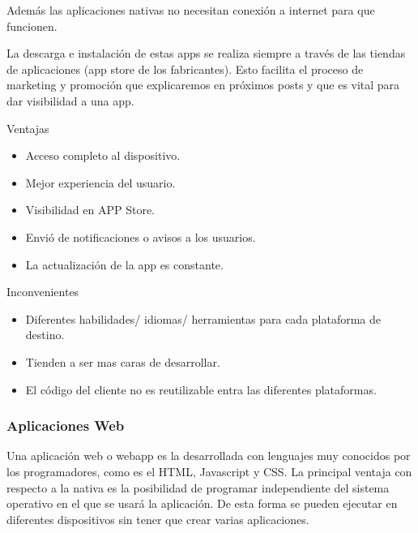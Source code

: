 Además las aplicaciones nativas no necesitan conexión a internet para que funcionen.

La descarga e instalación de estas apps se realiza siempre a través de las tiendas de aplicaciones (app store de los fabricantes). Esto facilita el proceso de marketing y promoción que explicaremos en próximos posts y que es vital para dar visibilidad a una app.

Ventajas
\setlength{\parskip}{0mm}
\begin{itemize}

	\item Acceso completo al dispositivo. 
	
	\item Mejor experiencia del usuario. 
	
	\item Visibilidad en APP Store.
	
	\item Envió de notificaciones o avisos a los usuarios.
	
	\item La actualización de la app es constante.
	
\end{itemize}

Inconvenientes

\begin{itemize}

	\item Diferentes habilidades/ idiomas/ herramientas para cada plataforma de destino.

	\item Tienden a ser mas caras de desarrollar. 

	\item El código del cliente no es reutilizable entra las diferentes plataformas.
	
\end{itemize}

\subsubsection{Aplicaciones Web}
\setlength{\parskip}{5mm}
Una aplicación web o webapp es la desarrollada con lenguajes muy conocidos por los programadores, como es el HTML, Javascript y CSS. La principal ventaja con respecto a la nativa es la posibilidad de programar independiente del sistema operativo en el que se usará la aplicación. De esta forma se pueden ejecutar en diferentes dispositivos sin tener que crear varias aplicaciones.

